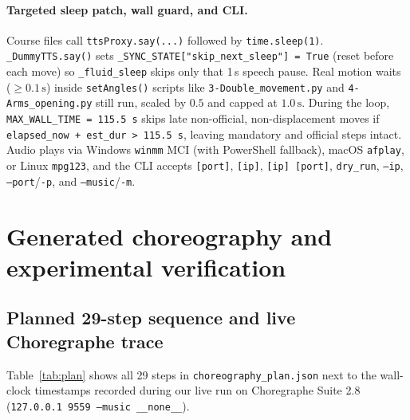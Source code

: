 \documentclass[11pt,a4paper]{article}
\newcommand{\code}[1]{\texttt{#1}}
\begin{document}
\paragraph{Targeted sleep patch, wall guard, and CLI.}
Course files call \code{ttsProxy.say(...)} followed by \code{time.sleep(1)}. \code{\_DummyTTS.say()} sets \code{\_SYNC\_STATE["skip\_next\_sleep"] = True} (reset before each move) so \code{\_fluid\_sleep} skips only that 1\,s speech pause. Real motion waits ($\ge 0.1\,\text{s}$) inside \code{setAngles()} scripts like \code{3-Double\_movement.py} and \code{4-Arms\_opening.py} still run, scaled by $0.5$ and capped at $1.0\,\text{s}$. During the loop, \code{MAX\_WALL\_TIME = 115.5\,s} skips late non-official, non-displacement moves if \code{elapsed\_now + est\_dur > 115.5\,s}, leaving mandatory and official steps intact. Audio plays via Windows \code{winmm} MCI (with PowerShell fallback), macOS \code{afplay}, or Linux \code{mpg123}, and the CLI accepts \code{[port]}, \code{[ip]}, \code{[ip] [port]}, \code{dry\_run}, \code{--ip}, \code{--port}/\code{-p}, and \code{--music}/\code{-m}.

\clearpage

\section{Generated choreography and experimental verification}

\subsection{Planned 29-step sequence and live Choregraphe trace}

Table~\ref{tab:plan} shows all 29 steps in \code{choreography\_plan.json} next to the wall-clock timestamps recorded during our live run on Choregraphe Suite 2.8 (\code{127.0.0.1 9559 --music \_\_none\_\_}).
\end{document}
